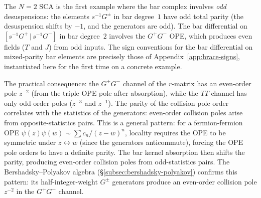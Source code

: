 \begin{remark}
\label{rem:N2-fermionic-lesson}
The $N{=}2$ SCA is the first example where the bar complex involves
\emph{odd} desuspensions: the elements $s^{-1}G^\pm$ in bar
degree~$1$ have odd total parity (the desuspension shifts by $-1$,
and the generators are odd). The bar differential on
$[s^{-1}G^+ \,|\, s^{-1}G^-]$ in bar degree~$2$ involves the
$G^+G^-$ OPE, which produces even fields ($T$ and $J$) from odd
inputs. The sign conventions for the bar differential on
mixed-parity bar elements are precisely those of
Appendix~\ref{app:brace-signs}, instantiated here for the first
time on a concrete example.

The practical consequence: the $G^+G^-$ channel of the $r$-matrix
has an even-order pole $z^{-2}$ (from the triple OPE pole after
absorption), while the $TT$ channel has only odd-order poles
($z^{-3}$ and $z^{-1}$). The parity of the collision pole order
correlates with the statistics of the generators: even-order
collision poles arise from opposite-statistics pairs. This is a
general pattern: for a fermion-fermion OPE
$\psi(z)\psi(w) \sim \sum c_n/(z-w)^n$, locality requires the
OPE to be symmetric under $z \leftrightarrow w$ (since the
generators anticommute), forcing the OPE pole orders to have a
definite parity. The bar kernel absorption then shifts the
parity, producing even-order collision poles from
odd-statistics pairs. The Bershadsky--Polyakov algebra
\textup{(}\S\ref{subsec:bershadsky-polyakov}\textup{)} confirms
this pattern: its half-integer-weight $G^\pm$ generators produce
an even-order collision pole $z^{-2}$ in the $G^+G^-$ channel.
\end{remark}

